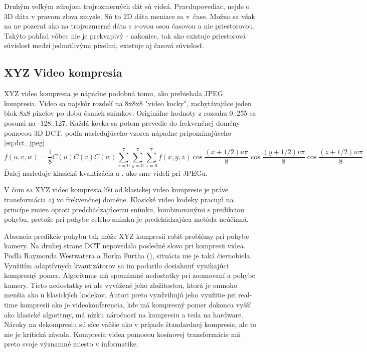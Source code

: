 Druhým veľkým zdrojom trojrozmerných dát sú videá. Pravdupovediac,
nejde o 3D dáta v pravom zlova zmysle. Sú to 2D dáta meniace sa v~čase.
Možno sa však na ne pozerať ako na trojrozmerné dáta s $z$-ovou osou časovou a
nie priestorovou. Takýto pohľad vôbec nie je prekvapivý - nakoniec,
tak ako existuje priestorová súvislosť medzi jednotlivými pixelmi,
existuje aj časová súvislosť.

\subsection{XYZ Video kompresia}
XYZ video kompresia je nápadne podobná tomu, ako prebiehala JPEG
kompresia. Video sa najskôr rozdelí na 8x8x8 "video kocky",
zachytávajúce jeden blok 8x8 pixelov po dobu ôsmich snímkov.
Originálne hodnoty z rozsahu 0..255 sa posunú na -128..127.
Každá kocka sa potom prevedie do frekvenčnej domény pomocou 3D DCT,
podľa nasledujúceho vzorca nápadne pripomínajúceho \eqref{eq:dct_jpeg}
\begin{equation*}
   f(u,v,w) = \frac{1}{8} C(u) C(v) C(w)
    \sum_{x=0}^7 \sum_{y=0}^7 \sum_{z=0}^7 f(x,y,z)
        \cos\frac{(x+1/2) u \pi}{8}
        \cos\frac{(y+1/2) v \pi}{8}
        \cos\frac{(z+1/2) w \pi}{8}
\end{equation*}
Ďalej nasleduje klasická kvantizácia a , ako sme
videli pri JPEGu.

V čom sa XYZ video kompresia líši od klasickej video kompresie je
práve transformácia aj vo frekvenčnej doméne. Klasické video kodeky
pracujú na princípe zmien oproti predchádzajúcemu snímku,
kombinovanými s predikciou pohybu, pretože pri pohybe celého
snímku je predchádzajúca metóda neúčinná.

Absencia predikcie pohybu tak môže XYZ kompresii robiť problémy pri
pohybe kamery. Na druhej strane DCT nepovedala posledné slovo pri
kompresii videa. Podľa Raymonda Westwatera a Borka Furtha 
(\cite{3ddct_adaptive}), situácia nie je taká
čiernobiela. Využitím adaptívnych kvantizátorov sa im podarilo
dosiahnuť vynikajúci kompresný pomer. Algoritmus má spomínané
nedostatky pri zoomovaní a pohybe kamery. Tieto nedostatky sú ale
vyvážené jeho zložitosťou, ktorá je omnoho menšia ako u klasických
kodekov. Autori preto vyzdvihujú jeho využitie pri real-time kompresii
ako je videokonferencia, kde má kompresný pomer dokonca vyšší ako
klasické algoritmy, má nízku náročnosť na kompresiu a teda na
hardware. Nároky na dekompresiu sú síce väčšie ako v prípade
štandardnej kompresie, ale to nie je kritická závada. Kompresia videa
pomocou kosínovej transformácie má preto svoje významné miesto v
informatike.

